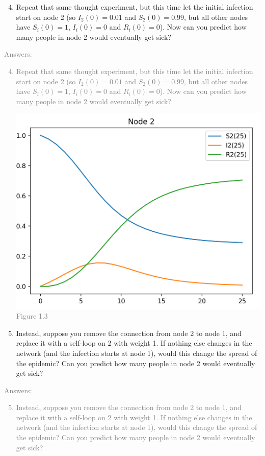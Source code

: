 \documentclass[11pt]{article}
\begin{document}
\begin{enumerate}
	\setcounter{enumi}{3}
	\item Repeat that same thought experiment, but this time let the initial infection start on node 2 (so $I_2(0) = 0.01$ and $S_2(0) = 0.99$, but all other nodes have $S_i(0)=1$, $I_i(0)=0$  and $R_i(0)=0$). Now can you predict how many people in node 2 would eventually get sick?
\end{enumerate}
\textcolor{gray}{
Answers:
\begin{enumerate}
	\setcounter{enumi}{3}
	\item Repeat that same thought experiment, but this time let the initial infection start on node 2 (so $I_2(0) = 0.01$ and $S_2(0) = 0.99$, but all other nodes have $S_i(0)=1$, $I_i(0)=0$  and $R_i(0)=0$). Now can you predict how many people in node 2 would eventually get sick?
\begin{center}
	\includegraphics[scale=0.8]{Figure1.3}\\
	Figure 1.3
\end{center}
\end{enumerate}
}

\begin{enumerate}
	\setcounter{enumi}{4}
	\item Instead, suppose you remove the connection from node 2 to node 1, and replace it with a self-loop on 2 with weight 1. If nothing else changes in the network (and the infection starts at node 1), would this change the spread of the epidemic? Can you predict how many people in node 2 would eventually get sick?
\end{enumerate}
\textcolor{gray}{
Answers:
\begin{enumerate}
	\setcounter{enumi}{4}
	\item Instead, suppose you remove the connection from node 2 to node 1, and replace it with a self-loop on 2 with weight 1. If nothing else changes in the network (and the infection starts at node 1), would this change the spread of the epidemic? Can you predict how many people in node 2 would eventually get sick?
\end{enumerate}
}
\end{document}
